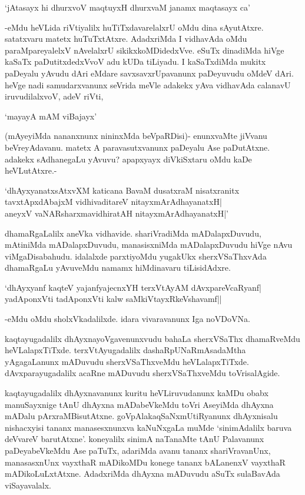 \begin{shloka}
`jAtasayx hi dhurxvoV maqtuyxH dhurxvaM janamx maqtasayx ca'
\end{shloka} 

-eMdu heVLida riVtiyalilx huTiTxdavarelalxrU oMdu dina sAyutAtxre. satatxvaru matetx huTuTxtAtxre. AdadxriMda I vidhavAda oMdu paraMpareyalelxV nAvelalxrU sikikxkoMDidedxVve. eSuTx dinadiMda hiVge kaSaTx paDutitxdedxVvoV adu kUDa tiLiyadu. I kaSaTxdiMda mukitx paDeyalu yAvudu dAri eMdare savxsavxrUpavanunx paDeyuvudu oMdeV dAri. heVge nadi samudarxvanunx seVrida meVle adakekx yAva vidhavAda calanavU iruvudilalxvoV, adeV riVti, 

\begin{shloka}
`mayayA mAM viBajayx'
\end{shloka}

(mAyeyiMda nananxnunx nininxMda beVpaRDisi)- enunxvaMte jiVvanu beVreyAdavanu. matetx A paravasutxvanunx paDeyalu Ase paDutAtxne. adakekx sAdhanegaLu yAvuvu? apapxyayx diVkiSxtaru oMdu kaDe heVLutAtxre.-

\begin{shloka}
`dhAyxyanatxsAtxvXM katicana BavaM dusatxraM nisatxranitx\\
tavxtApxdAbajxM vidhivaditareV nitayxmArAdhayanatxH|\\
aneyxV vaNARsharxmavidhiratAH nitayxmArAdhayanatxH|'
\end{shloka}

dhamaRgaLalilx aneVka vidhavide. shariVradiMda mADalapxDuvudu, mAtiniMda mADalapxDuvudu, manasisxniMda mADalapxDuvudu hiVge nAvu viMgaDisabahudu. idalalxde parxtiyoMdu yugakUkx sherxVSaThxvAda dhamaRgaLu yAvuveMdu namamx hiMdinavaru tiLisidAdxre.

\begin{shloka}
`dhAyxyanf kaqteV yajanfyajecnxYH terxVtAyAM dAvxpareV\s caRyanf|\\
yadAponxVti tadAponxVti kalw saMkiVtayxRkeVshavamf||
\end{shloka}

-eMdu oMdu sholxVkadalilxde. idara vivaravanunx Iga noVDoVNa.

kaqtayugadalilx dhAyxnayoVgavenunxvudu bahaLa sherxVSaThx dhamaRveMdu heVLalapxTiTxde. terxVtAyugadalilx dashaRpUNaRmAsadaMtha yAgagaLanunx mADuvudu sherxVSaThxveMdu heVLalapxTiTxde. dAvxparayugadalilx acaRne mADuvudu sherxVSaThxveMdu toVrisalAgide.

kaqtayugadalilx dhAyxnavanunx kuritu heVLiruvudanunx kaMDu obabx manuSayxnige tAnU dhAyxna mADabeVkeMdu toVri AseyiMda dhAyxna mADalu pArxraMBisutAtxne. goVpAlakaqSaNxmUtiRyanunx dhAyxnisalu nishacxyisi tananx manasesxnunxva kaNuNxgaLa muMde `sinimAdalilx baruva deVvareV barutAtxne'. koneyalilx sinimA naTanaMte tAnU Palavanunx paDeyabeVkeMdu Ase paTuTx, adariMda avanu tananx shariVravanUnx, manasasxnUnx vayxthaR mADikoMDu konege tananx bALanenxV vayxthaR mADikoLuLxtAtxne. AdadxriMda dhAyxna mADuvudu aSuTx sulaBavAda viSayavalalx.

